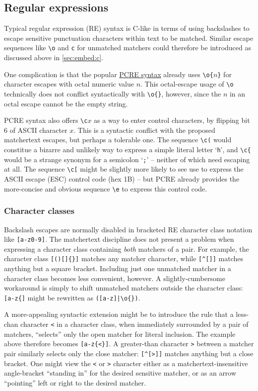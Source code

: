 \subsection{Regular expressions}

Typical regular expression (RE) syntax is C-like
in terms of using backslashes to escape sensitive punctuation characters
within text to be matched.
Similar escape sequences like \verb|\o| and \verb|c| for unmatched matchers
could therefore be introduced as discussed above in \cref{sec:embed:c}.

One complication is that the popular
\href{https://www.pcre.org/original/doc/html/pcrepattern.html}{PCRE syntax}
already uses \verb|\o{|$n$\verb|}|
for character escapes with octal numeric value $n$.
This octal-escape usage of \verb|\o|
technically does not conflict syntactically
with \verb|\o{}|, however,
since the $n$ in an octal escape cannot be the empty string.

PCRE syntax also offers \verb|\c|$x$ as a way to enter control characters,
by flipping bit 6 of ASCII character $x$.
This is a syntactic conflict with the proposed matchertext escapes,
but perhaps a tolerable one.
The sequence \verb|\c(| would constitue
a bizarre and unlikely way to express a simple literal letter `\verb|h|',
and \verb|\c{| would be a strange synonym for a semicolon `\verb|;|' --
neither of which need escaping at all.
The sequence \verb|\c[| might be slightly more likely to see use
to express the ASCII escape (ESC) control code (hex 1B) --
but PCRE already provides the more-concise and obvious sequence \verb|\e|
to express this control code.

\subsubsection{Character classes}

Backslash escapes are normally disabled in
bracketed RE character class notation like \verb|[a-z0-9]|.
The matchertext discipline does not present a problem
when expressing a character class containing \emph{both} matchers of a pair.
For example,
the character class \verb|[()[]{}]| matches any matcher character,
while \verb|[^[]]| matches anything but a square bracket.
Including just one unmatched matcher in a character class
becomes less convenient, however.
A slightly-cumbersome workaround
is simply to shift unmatched matchers outside the character class:
\eg \verb|[a-z{]| might be rewritten as \verb=([a-z]|\o{})=.

A more-appealing syntactic extension might be to introduce the rule
that a less-chan character \verb|<| in a character class,
when immediately surrounded by a pair of matchers,
``selects'' only the open matcher for literal inclusion.
The example above therefore becomes \verb|[a-z{<}]|.
A greater-than character \verb|>| between a matcher pair
similarly selects only the close matcher:
\verb|[^[>]]| matches anything but a close bracket.
One might view the \verb|<| or \verb|>| character either
as a matchertext-insensitive angle-bracket
``standing in'' for the desired sensitive matcher,
or as an arrow ``pointing'' left or right to the desired matcher.



